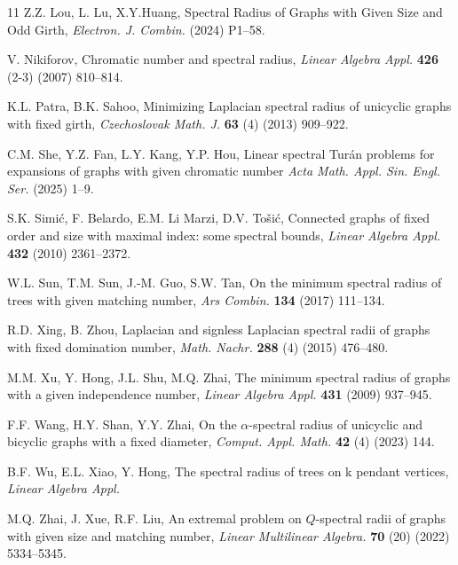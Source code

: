 \documentclass[12pt]{amsart}
\begin{document}
\begin{thebibliography}{11}
Z.Z. Lou, L. Lu, X.Y.Huang,
Spectral Radius of Graphs with Given Size and Odd Girth,
\emph{Electron. J. Combin.}
(2024) P1--58.

V. Nikiforov,
Chromatic number and spectral radius,
\emph{Linear Algebra Appl.} 
\textbf{426} (2-3) (2007) 810--814. 

K.L. Patra, B.K. Sahoo,
Minimizing Laplacian spectral radius of unicyclic graphs with fixed girth,
\emph{Czechoslovak Math. J.}
\textbf{63} (4) (2013) 909--922. 

C.M. She, Y.Z. Fan, L.Y. Kang, Y.P. Hou,
Linear spectral Tur{\'a}n problems for expansions of graphs with given chromatic number
\emph{Acta Math. Appl. Sin. Engl. Ser.}
(2025) 1--9. 

S.K. Simi\'c, F. Belardo, E.M. Li Marzi, D.V. To\v{s}i\'c, 
Connected graphs of fixed order and size with maximal index: some spectral bounds, 
\emph{Linear Algebra Appl.}
\textbf{432} (2010)  2361--2372. 

W.L. Sun, T.M. Sun, J.-M. Guo, S.W. Tan,
On the minimum spectral radius of trees with given matching number, 
\emph{Ars Combin.} 
\textbf{134} (2017) 111--134. 

R.D. Xing, B. Zhou,
Laplacian and signless Laplacian spectral radii of graphs with fixed domination number,
\emph{Math. Nachr.} 
\textbf{288} (4) (2015)  476--480. 

M.M. Xu, Y. Hong, J.L. Shu,  M.Q. Zhai, 
The minimum spectral radius of graphs with a given independence number, 
\emph{Linear Algebra Appl.}
\textbf{431} (2009)  937--945. 

F.F. Wang, H.Y. Shan, Y.Y. Zhai,
On the $\alpha$-spectral radius of unicyclic and bicyclic graphs with a fixed diameter,
\emph{Comput. Appl. Math.}
\textbf{42} (4) (2023) 144. 

B.F. Wu, E.L. Xiao, Y. Hong, 
The spectral radius of trees on k pendant vertices, 
\emph{Linear Algebra Appl.} 

M.Q. Zhai, J. Xue, R.F. Liu, 
An extremal problem on {$Q$}-spectral radii of graphs with
given size and matching number, 
\emph{Linear Multilinear Algebra.} 
\textbf{70} (20) (2022) 5334--5345. 

\end{thebibliography}
\end{document}
